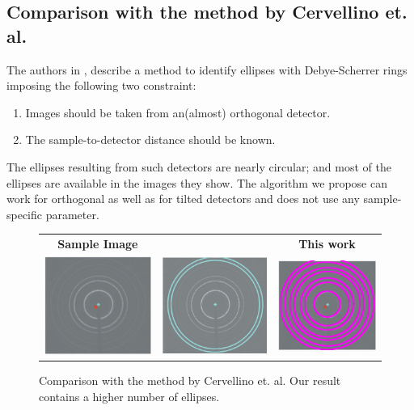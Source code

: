\documentclass[preprint]{iucr}              %
\newcommand\dsrs{Debye-Scherrer rings}
\begin{document}
\subsection{\textbf{Comparison with the method by Cervellino et. al.}}
\label{sec:cerv}
The authors in \cite{cervellino2006folding}, describe a method to identify
ellipses with \dsrs{} imposing the following two constraint: 

\begin{enumerate}
    \item Images should be taken from an(almost) orthogonal detector.
    \item The sample-to-detector distance should be known.
\end{enumerate}

The ellipses resulting from such detectors are nearly circular; and most of the
ellipses are available in the images they show. 
The algorithm we propose can work for orthogonal as well as for tilted detectors
and does not use any sample-specific parameter. 

\begin{figure}
\centering
\begin{tabular}{ccc}

\textbf{Sample Image} & \textbf{\cite{cervellino2006folding}} & \textbf{This work}
\\
\includegraphics[width=.30\linewidth]{Comparisons/fold1.png}
&
\includegraphics[width=.30\linewidth]{Comparisons/fold1CervResult.png}
&
\includegraphics[width=.30\linewidth]{Comparisons/fold1OurResult.png}
\end{tabular}

\label{fig:compare_cerv}
\caption {Comparison with the method by Cervellino et. al.
Our result contains a higher number of ellipses.}
\end{figure}
\end{document}
